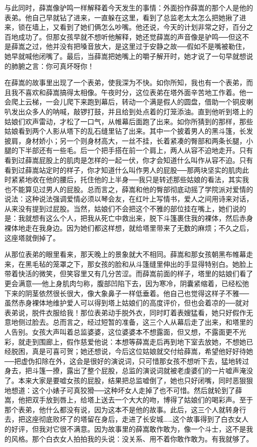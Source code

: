 与此同时，薛嵩像驴鸣一样解释着今天发生的事情：外面扮作薛嵩的那个人是他的表弟。他自己早就钻了进来，一直躲在这里，看到了总监老太太怎么把她揪了进来，锁在墙上，又看到了她们俩怎么吵嘴。他还说，今天的计划非常之好，百分之百地成功了。但那女孩早就不想听他解释，她还觉薛嵩的声音像是驴鸣──但这不是薛嵩之过，他并没有把嗓音放大，是这里过于安静之故──假如不是嘴被勒住，她早就喊他闭嘴了。最后，当薛嵩把她嘴上的嚼子解开时，她才说了一句早就想说的肺腑之言：你可真坏呀你！ 

在薛嵩的故事里出现了一个表弟，使我深为不快。如你所知，我也有一个表弟，而且我不喜欢和薛嵩搞得太相像。午夜时分，这位表弟在塔外面辛苦地工作着。他一会爬上云梯，一会儿爬下来跑到幕后，转动一个满是假人的圆盘，借助一个铜皮喇叭发出众多人的呐喊，敲锣打鼓，并且给到处点着的灯笼添油。直到他听到塔上的姑娘们欢声雷动，才松了一口气，从帷幕后面跑了出来。如你所猜到的那样，那些姑娘看到两个人影从塔下的乱石缝里钻了出来。其中一个披着男人的黑斗篷，长发披肩，身材娇小；另一个则身材高大，一丝不挂，长着紧凑的臀部和两条长腿，小腿的下半部还有一些毛。后一个把手搭在前一个肩上，两人从容不迫地走开。只有看到过薛嵩屁股上的肌肉是怎样的一起一伏，你才会知道什么叫作从容不迫。只有看到过薛嵩站定时的样子，你才知道什么叫作男人的屁股──那两块坚实的肌肉此时紧紧地收在他的腰后，托住他的上半身──我只是转述那些姑娘的看法，其实我也不能算见过男人的屁股。总而言之，薛嵩和他的臀部彻底动摇了学院派对爱情的说法：这种说法强调爱情必须以琴会友，在红叶上写情书，爱人之间用诗来对话，从来没有提到过屁股。当然，姑娘们不会把这个不雅的部位挂在嘴上，她们说的是：我就想有这么个人，把我从死亡中救出来，脱下斗篷裹住我的裸体，然后赤身裸体地走在我身边。因为她们都这样想，就给塔里带来了无数的麻烦；不久之后，这座塔就倒掉了。 

从那位表弟的眼里看来，那天晚上的景象就大不相同。薛嵩和那女孩朝黑布帷幕走来，在黑毛毡的笼罩之下，那女孩的脸和从斗篷缝里伸出的手显得特别白。她脸上带着快活的微笑，但笑容里又有几分苦涩。而薛嵩前面的样子，塔里的姑娘们看了更会满意──他上身肌肉匀称，腹部凹陷下去，因为寒冷，阴囊紧缩着，已经松弛下来的阴茎依然很长很大，像大象鼻子一样低垂着。他自己也觉得这样子不雅──虽然赤身裸体地维护爱人可以得到塔上姑娘们的高度评价，但也会着凉的──就对表弟说，脱件衣服给我！那位表弟动手脱外衣，同时盯着表嫂猛看，她只好假作无意地侧过脸去。总而言之，经过短暂的准备，这三个人从幕后走了出来，和塔里的人告别。女孩大声叫着总监婆婆，这位婆婆本不想露面，但又想，不露面更不光彩，就走到围廊上，假作慈爱他说：本想等薛嵩走后再到地下室去放她，不想她已经脱困，真是可喜可贺；她还想说，今后这位姑娘就交付给薛嵩，希望他好好待她──把虚伪扣除在外，这会是很好的演说词，只可惜那女孩不想听下去，猛地转过身去，把斗篷一撩，露出了整个屁股，总监的演说词就被老虔婆们的一片嘘声淹没了。本来大家是要嘘女孩的屁股，结果把总监嘘倒了，她也只好闭嘴，同时恶狠狠地想道：这个小婊子可真狡猾──这种坏女人走掉了也不可惜。然后就轮到了薛嵩，他把双手放到唇上，给塔上送去一个大大的吻，博得了姑娘们的喝彩声。至于那个表弟，他什么都没有说，因为这本不是他的故事。此后，这三个人就转身行去，把这座彻底败坏了的塔留在身后，走进了长安城……这个故事得到了白衣女人的好评，但我对它很不满意。因为故事里的薛嵩敢作敢为，像一个斗士，这不是我的风格。那个白衣女人拍拍我的头说：没关系、用不着你敢作敢为。有我就够了。 

